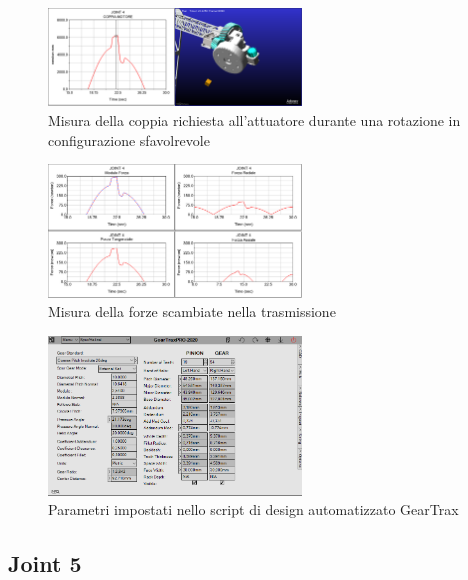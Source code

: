 \documentclass[%
corpo=11pt,
twoside,
 stile=classica,
oldstyle,
greek,%
]{toptesi}
\begin{document}
	
		\begin{figure}
			\centering
			\includegraphics[width=0.6\textwidth]{Plots/POLSO1/polso1torque.png}
			\caption{Misura della coppia richiesta all'attuatore durante una rotazione in configurazione sfavolrevole}
			\label{fig:MBDpolso1t}
		\end{figure} 
		\begin{figure}
			\centering
			\includegraphics[width=0.6\textwidth]{Plots/POLSO1/polso1forces.png}
			\caption{Misura della forze scambiate nella trasmissione}
			\label{fig:MBDpolso1f}
		\end{figure} 
		\begin{figure}
			\centering
			\includegraphics[width=0.6\textwidth]{Plots/POLSO1/gear_polso1.png}
			\caption{Parametri impostati nello script di design automatizzato GearTrax}
			\label{fig:Gearpolso1}
		\end{figure} 
	
		\subsection{Joint 5}
		
\end{document}
